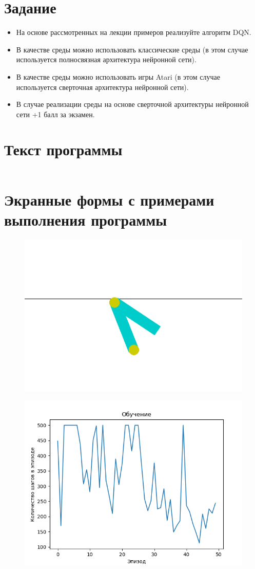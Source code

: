 \documentclass[a4paper]{article}
\begin{document}
  \section{Задание}
  \begin{itemize}
    \item На основе рассмотренных на лекции примеров реализуйте алгоритм DQN.
    \item В качестве среды можно использовать классические среды (в этом случае используется полносвязная архитектура нейронной сети).
    \item В качестве среды можно использовать игры Atari (в этом случае используется сверточная архитектура нейронной сети).
    \item В случае реализации среды на основе сверточной архитектуры нейронной сети +1 балл за экзамен.
  \end{itemize}

  \section{Текст программы}
  \inputminted{python}{6.py}
  \pagebreak

  \section{Экранные формы с примерами выполнения программы}
  \begin{figure}[H]
    \centering
    \includegraphics[scale=0.6]{61}
  \end{figure}
  \begin{figure}[H]
    \centering
    \includegraphics[scale=0.6]{62}
  \end{figure}
\end{document}

